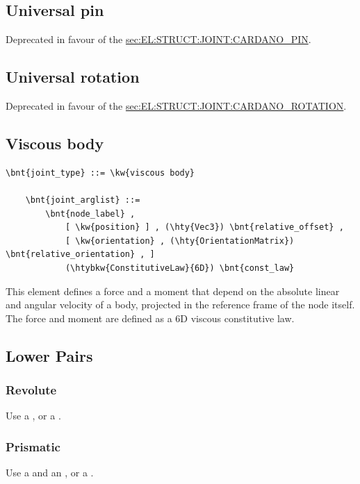 \subsection{Universal pin}
\label{sec:EL:STRUCT:JOINT:UNIVERSAL_PIN}
Deprecated in favour of the
\hyperref{\kw{Cardano pin}}{\kw{Cardano pin} (see Section~}{)}{sec:EL:STRUCT:JOINT:CARDANO_PIN}.



\subsection{Universal rotation}
\label{sec:EL:STRUCT:JOINT:UNIVERSAL_ROTATION}
Deprecated in favour of the
\hyperref{\kw{Cardano rotation}}{\kw{Cardano rotation} (see Section~}{)}{sec:EL:STRUCT:JOINT:CARDANO_ROTATION}.

\subsection{Viscous body}
\label{sec:EL:STRUCT:JOINT:VISCOUS_BODY}
\begin{Verbatim}[commandchars=\\\{\}]
    \bnt{joint_type} ::= \kw{viscous body}

    \bnt{joint_arglist} ::=
        \bnt{node_label} ,
            [ \kw{position} ] , (\hty{Vec3}) \bnt{relative_offset} ,
            [ \kw{orientation} , (\hty{OrientationMatrix}) \bnt{relative_orientation} , ]
            (\htybkw{ConstitutiveLaw}{6D}) \bnt{const_law}
\end{Verbatim}
This element defines a force and a moment that depend on the absolute 
linear and angular velocity of a body, projected in the reference frame
of the node itself.
The force and moment are defined as a 6D viscous constitutive law.


\subsection{Lower Pairs}

\subsubsection{Revolute}
Use a , or a .

\subsubsection{Prismatic}
Use a  and an , or a .

